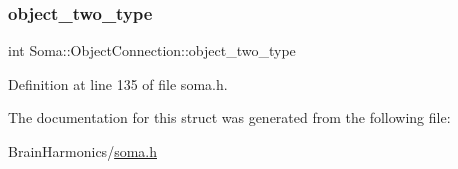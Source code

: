 \subsubsection{\texorpdfstring{object\+\_\+two\+\_\+type}{object\_two\_type}}
{\footnotesize\ttfamily int Soma\+::\+Object\+Connection\+::object\+\_\+two\+\_\+type}



Definition at line 135 of file soma.\+h.



The documentation for this struct was generated from the following file\+:\begin{DoxyCompactItemize}
\item 
Brain\+Harmonics/\mbox{\hyperlink{soma_8h}{soma.\+h}}\end{DoxyCompactItemize}

